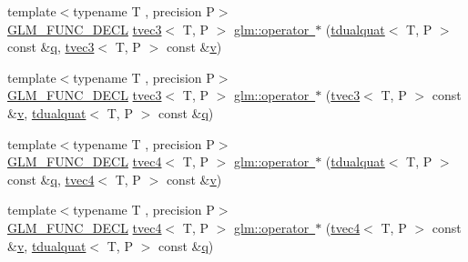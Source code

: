 \begin{DoxyCompactItemize}
\item 
{\footnotesize template$<$typename T , precision P$>$ }\\\mbox{\hyperlink{setup_8hpp_ab2d052de21a70539923e9bcbf6e83a51}{G\+L\+M\+\_\+\+F\+U\+N\+C\+\_\+\+D\+E\+CL}} \mbox{\hyperlink{structglm_1_1tvec3}{tvec3}}$<$ T, P $>$ \mbox{\hyperlink{group__gtx__dual__quaternion_gaf6c5a7a17854cbb1c8e6e34cc494f7af}{glm\+::operator $\ast$}} (\mbox{\hyperlink{structglm_1_1tdualquat}{tdualquat}}$<$ T, P $>$ const \&\mbox{\hyperlink{glad_8h_a514729309336df22bcc8eda979d6ced4}{q}}, \mbox{\hyperlink{structglm_1_1tvec3}{tvec3}}$<$ T, P $>$ const \&\mbox{\hyperlink{glad_8h_a14cfbe2fc2234f5504618905b69d1e06}{v}})
\item 
{\footnotesize template$<$typename T , precision P$>$ }\\\mbox{\hyperlink{setup_8hpp_ab2d052de21a70539923e9bcbf6e83a51}{G\+L\+M\+\_\+\+F\+U\+N\+C\+\_\+\+D\+E\+CL}} \mbox{\hyperlink{structglm_1_1tvec3}{tvec3}}$<$ T, P $>$ \mbox{\hyperlink{group__gtx__dual__quaternion_ga025428539d309a905ce2faeec7a35639}{glm\+::operator $\ast$}} (\mbox{\hyperlink{structglm_1_1tvec3}{tvec3}}$<$ T, P $>$ const \&\mbox{\hyperlink{glad_8h_a14cfbe2fc2234f5504618905b69d1e06}{v}}, \mbox{\hyperlink{structglm_1_1tdualquat}{tdualquat}}$<$ T, P $>$ const \&\mbox{\hyperlink{glad_8h_a514729309336df22bcc8eda979d6ced4}{q}})
\item 
{\footnotesize template$<$typename T , precision P$>$ }\\\mbox{\hyperlink{setup_8hpp_ab2d052de21a70539923e9bcbf6e83a51}{G\+L\+M\+\_\+\+F\+U\+N\+C\+\_\+\+D\+E\+CL}} \mbox{\hyperlink{structglm_1_1tvec4}{tvec4}}$<$ T, P $>$ \mbox{\hyperlink{group__gtx__dual__quaternion_gaf32d1192c854e65c73fe7815e4177e8d}{glm\+::operator $\ast$}} (\mbox{\hyperlink{structglm_1_1tdualquat}{tdualquat}}$<$ T, P $>$ const \&\mbox{\hyperlink{glad_8h_a514729309336df22bcc8eda979d6ced4}{q}}, \mbox{\hyperlink{structglm_1_1tvec4}{tvec4}}$<$ T, P $>$ const \&\mbox{\hyperlink{glad_8h_a14cfbe2fc2234f5504618905b69d1e06}{v}})
\item 
{\footnotesize template$<$typename T , precision P$>$ }\\\mbox{\hyperlink{setup_8hpp_ab2d052de21a70539923e9bcbf6e83a51}{G\+L\+M\+\_\+\+F\+U\+N\+C\+\_\+\+D\+E\+CL}} \mbox{\hyperlink{structglm_1_1tvec4}{tvec4}}$<$ T, P $>$ \mbox{\hyperlink{group__gtx__dual__quaternion_ga86c03ef63303143897cb83fa308a459c}{glm\+::operator $\ast$}} (\mbox{\hyperlink{structglm_1_1tvec4}{tvec4}}$<$ T, P $>$ const \&\mbox{\hyperlink{glad_8h_a14cfbe2fc2234f5504618905b69d1e06}{v}}, \mbox{\hyperlink{structglm_1_1tdualquat}{tdualquat}}$<$ T, P $>$ const \&\mbox{\hyperlink{glad_8h_a514729309336df22bcc8eda979d6ced4}{q}})

\end{DoxyCompactItemize}

